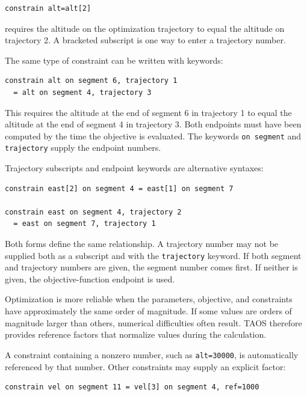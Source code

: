 \begin{lstlisting}[style=taosmanual]
constrain alt=alt[2]
\end{lstlisting}

requires the altitude on the optimization trajectory to equal the altitude on trajectory
2.  A bracketed subscript is one way to enter a trajectory number.

The same type of constraint can be written with keywords:

\begin{lstlisting}[style=taosmanual]
constrain alt on segment 6, trajectory 1
  = alt on segment 4, trajectory 3
\end{lstlisting}

This requires the altitude at the end of segment 6 in trajectory 1 to equal the altitude
at the end of segment 4 in trajectory 3.  Both endpoints must have been computed by
the time the objective is evaluated.  The keywords \texttt{on segment} and
\texttt{trajectory} supply the endpoint numbers.

Trajectory subscripts and endpoint keywords are alternative syntaxes:

\begin{lstlisting}[style=taosmanual]
constrain east[2] on segment 4 = east[1] on segment 7

constrain east on segment 4, trajectory 2
  = east on segment 7, trajectory 1
\end{lstlisting}

Both forms define the same relationship.  A trajectory number may not be supplied
both as a subscript and with the \texttt{trajectory} keyword.  If both segment and
trajectory numbers are given, the segment number comes first.  If neither is given,
the objective-function endpoint is used.


Optimization is more reliable when the parameters, objective, and constraints have
approximately the same order of magnitude.  If some values are orders of magnitude
larger than others, numerical difficulties often result.  TAOS therefore provides
reference factors that normalize values during the calculation.

A constraint containing a nonzero number, such as \texttt{alt=30000}, is
automatically referenced by that number.  Other constraints may supply an explicit
factor:

\begin{lstlisting}[style=taosmanual]
constrain vel on segment 11 = vel[3] on segment 4, ref=1000
\end{lstlisting}

